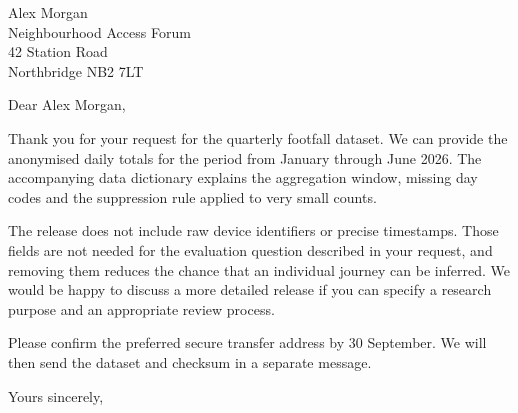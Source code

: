 \documentclass[paper=a4,fontsize=11pt,parskip=half,foldmarks=off,
  enlargefirstpage=true]{scrlttr2}
\begin{document}
\begin{letter}{
  Alex Morgan\\
  Neighbourhood Access Forum\\
  42 Station Road\\
  Northbridge NB2 7LT}
\opening{Dear Alex Morgan,}

Thank you for your request for the quarterly footfall dataset. We can provide
the anonymised daily totals for the period from January through June 2026.
The accompanying data dictionary explains the aggregation window, missing
day codes and the suppression rule applied to very small counts.

The release does not include raw device identifiers or precise timestamps.
Those fields are not needed for the evaluation question described in your
request, and removing them reduces the chance that an individual journey can
be inferred. We would be happy to discuss a more detailed release if you can
specify a research purpose and an appropriate review process.

Please confirm the preferred secure transfer address by 30 September. We
will then send the dataset and checksum in a separate message.

\closing{Yours sincerely,}
\end{letter}
\end{document}
